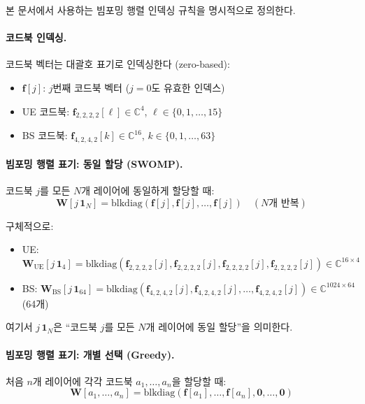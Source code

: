 \documentclass[10pt]{article}
\begin{document}
본 문서에서 사용하는 빔포밍 행렬 인덱싱 규칙을 명시적으로 정의한다.

\paragraph{코드북 인덱싱.}
코드북 벡터는 대괄호 표기로 인덱싱한다 (zero-based):
\begin{itemize}
    \item $\mathbf{f}[j]$: $j$번째 코드북 벡터 ($j=0$도 유효한 인덱스)
    \item UE 코드북: $\mathbf{f}_{2,2,2,2}[\ell] \in \mathbb{C}^4$, $\ell \in \{0, 1, \ldots, 15\}$
    \item BS 코드북: $\mathbf{f}_{4,2,4,2}[k] \in \mathbb{C}^{16}$, $k \in \{0, 1, \ldots, 63\}$
\end{itemize}

\paragraph{빔포밍 행렬 표기: 동일 할당 (SWOMP).}
코드북 $j$를 모든 $N$개 레이어에 동일하게 할당할 때:
\begin{equation}
\mathbf{W}[j\,\mathbf{1}_N] = \text{blkdiag}(\mathbf{f}[j], \mathbf{f}[j], \ldots, \mathbf{f}[j]) \quad (N\text{개 반복})
\end{equation}

구체적으로:
\begin{itemize}
    \item UE: $\mathbf{W}_{\text{UE}}[j\,\mathbf{1}_4] = \text{blkdiag}(\mathbf{f}_{2,2,2,2}[j], \mathbf{f}_{2,2,2,2}[j], \mathbf{f}_{2,2,2,2}[j], \mathbf{f}_{2,2,2,2}[j]) \in \mathbb{C}^{16 \times 4}$
    \item BS: $\mathbf{W}_{\text{BS}}[j\,\mathbf{1}_{64}] = \text{blkdiag}(\mathbf{f}_{4,2,4,2}[j], \mathbf{f}_{4,2,4,2}[j], \ldots, \mathbf{f}_{4,2,4,2}[j]) \in \mathbb{C}^{1024 \times 64}$ (64개)
\end{itemize}

여기서 $j\,\mathbf{1}_N$은 ``코드북 $j$를 모든 $N$개 레이어에 동일 할당''을 의미한다.

\paragraph{빔포밍 행렬 표기: 개별 선택 (Greedy).}
처음 $n$개 레이어에 각각 코드북 $a_1, \ldots, a_n$을 할당할 때:
\begin{equation}
\mathbf{W}[a_1, \ldots, a_n] = \text{blkdiag}(\mathbf{f}[a_1], \ldots, \mathbf{f}[a_n], \mathbf{0}, \ldots, \mathbf{0})
\end{equation}
\end{document}
